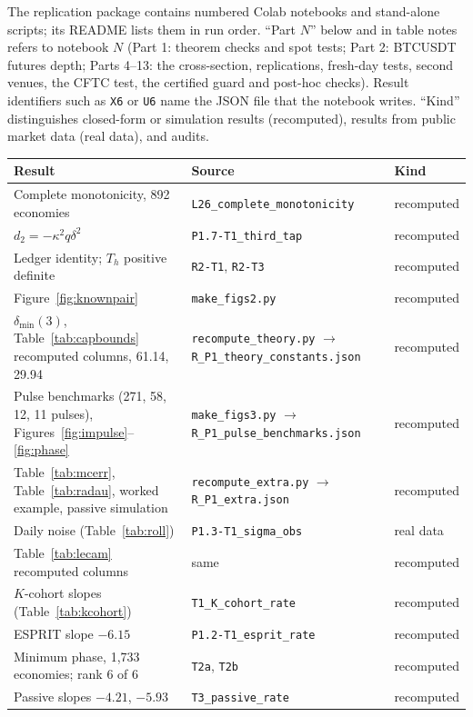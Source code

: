 \documentclass[12pt]{article}
\theoremstyle{definition}
\theoremstyle{remark}
\begin{document}
The replication package contains numbered Colab notebooks and stand-alone scripts; its README lists them in run order. ``Part $N$'' below and in table notes refers to notebook $N$ (Part 1: theorem checks and spot tests; Part 2: BTCUSDT futures depth; Parts 4--13: the cross-section, replications, fresh-day tests, second venues, the CFTC test, the certified guard and post-hoc checks). Result identifiers such as \texttt{X6} or \texttt{U6} name the JSON file that the notebook writes. ``Kind'' distinguishes closed-form or simulation results (recomputed), results from public market data (real data), and audits.

\begin{longtable}{p{}p{}p{}}
\toprule
Result & Source & Kind\\
\midrule
\endhead
Complete monotonicity, 892 economies & \nolinkurl{L26_complete_monotonicity} & recomputed\\
$d_2=-\kappa^2q\delta^2$ & \nolinkurl{P1.7-T1_third_tap} & recomputed\\
Ledger identity; $T_h$ positive definite & \nolinkurl{R2-T1}, \nolinkurl{R2-T3} & recomputed\\
Figure~\ref{fig:knownpair} & \nolinkurl{make_figs2.py} & recomputed\\
$\delta_{\min}(3)$, Table~\ref{tab:capbounds} recomputed columns, 61.14, 29.94 & \nolinkurl{recompute_theory.py} $\to$ \nolinkurl{R_P1_theory_constants.json} & recomputed\\
Pulse benchmarks (271, 58, 12, 11 pulses), Figures~\ref{fig:impulse}--\ref{fig:phase} & \nolinkurl{make_figs3.py} $\to$ \nolinkurl{R_P1_pulse_benchmarks.json} & recomputed\\
Table~\ref{tab:mcerr}, Table~\ref{tab:radau}, worked example, passive simulation & \nolinkurl{recompute_extra.py} $\to$ \nolinkurl{R_P1_extra.json} & recomputed\\
Daily noise (Table~\ref{tab:roll}) & \nolinkurl{P1.3-T1_sigma_obs} & real data\\
Table~\ref{tab:lecam} recomputed columns & same & recomputed\\
$K$-cohort slopes (Table~\ref{tab:kcohort}) & \nolinkurl{T1_K_cohort_rate} & recomputed\\
ESPRIT slope $-6.15$ & \nolinkurl{P1.2-T1_esprit_rate} & recomputed\\
Minimum phase, 1,733 economies; rank 6 of 6 & \nolinkurl{T2a}, \nolinkurl{T2b} & recomputed\\
Passive slopes $-4.21$, $-5.93$ & \nolinkurl{T3_passive_rate} & recomputed\\

\end{longtable}
\end{document}
